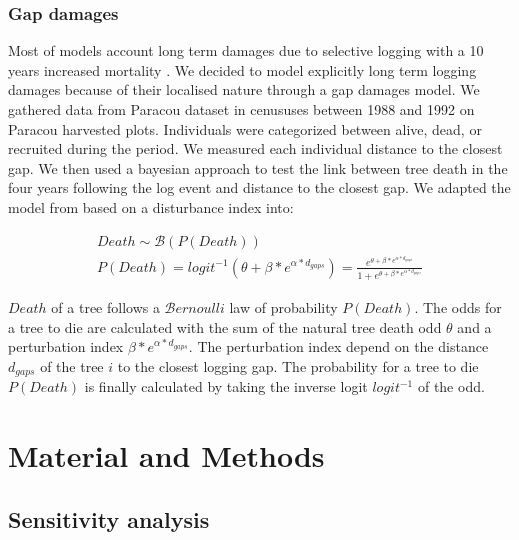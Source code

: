 \documentclass[12pt,]{article}
\let\oldsection\section
\renewcommand\section{\newpage\oldsection}
\theoremstyle{definition}
\theoremstyle{definition}
\theoremstyle{remark}
\begin{document}
\subsubsection{Gap damages}\label{gap-damages}

Most of models account long term damages due to selective logging with a
10 years increased mortality \citep{Huth2004, Khler2004, Ruger2008}. We
decided to model explicitly long term logging damages because of their
localised nature through a gap damages model. We gathered data from
Paracou dataset \citep{Guehl2004} in cenususes between 1988 and 1992 on
Paracou harvested plots. Individuals were categorized between alive,
dead, or recruited during the period. We measured each individual
distance to the closest gap. We then used a bayesian approach to test
the link between tree death in the four years following the log event
and distance to the closest gap. We adapted the model from
\citet{Herault2010} based on a disturbance index into:

\begin{equation}
  \begin{array}{c} 
    Death \sim \mathcal{B}(P(Death)) \\
    P(Death) = logit^{-1}(\theta + \beta*e^{\alpha*d_{gaps}}) = \frac{e^{\theta + \beta*e^{\alpha*d_{gaps}}}}{1 + e^{\theta + \beta*e^{\alpha*d_{gaps}}}}
  \end{array}
  \label{eq:death}
\end{equation}

\(Death\) of a tree follows a \(\mathcal{B}ernoulli\) law of probability
\(P(Death)\). The odds for a tree to die are calculated with the sum of
the natural tree death odd \(\theta\) and a perturbation index
\(\beta*e^{\alpha*d_{gaps}}\). The perturbation index depend on the
distance \(d_{gaps}\) of the tree \(i\) to the closest logging gap. The
probability for a tree to die \(P(Death)\) is finally calculated by
taking the inverse logit \(logit^{-1}\) of the odd.

\section{Material and Methods}\label{material-and-methods}

\subsection{Sensitivity analysis}\label{sensitivity-analysis}
\end{document}
